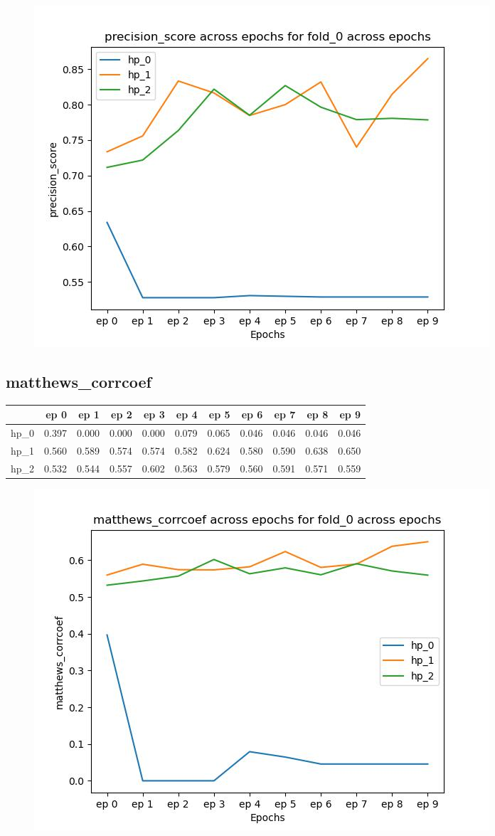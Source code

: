 \documentclass{article}
\begin{document}
\begin{figure}[H]
\includegraphics[scale = 0.75]{fold_0/precision_score}
\end{figure}
\subsection{matthews\_corrcoef}
\begin{tabular}{lrrrrrrrrrr}
\toprule
{} &   ep 0 &   ep 1 &   ep 2 &   ep 3 &   ep 4 &   ep 5 &   ep 6 &   ep 7 &   ep 8 &   ep 9 \\
\midrule
hp\_0 &  0.397 &  0.000 &  0.000 &  0.000 &  0.079 &  0.065 &  0.046 &  0.046 &  0.046 &  0.046 \\
hp\_1 &  0.560 &  0.589 &  0.574 &  0.574 &  0.582 &  0.624 &  0.580 &  0.590 &  0.638 &  0.650 \\
hp\_2 &  0.532 &  0.544 &  0.557 &  0.602 &  0.563 &  0.579 &  0.560 &  0.591 &  0.571 &  0.559 \\
\bottomrule
\end{tabular}

\begin{figure}[H]
\includegraphics[scale = 0.75]{fold_0/matthews_corrcoef}
\end{figure}
\end{document}
